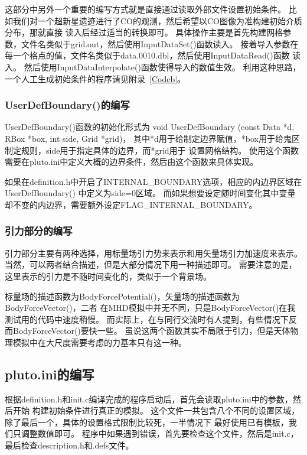 这部分中另外一个重要的编写方式就是直接通过读取外部文件设置初始条件。
比如我们对一个超新星遗迹进行了CO的观测，然后希望以CO图像为准构建初始介质分布，那就直接
读入后经过适当的转换即可。
具体操作主要是首先构建网格参数，文件名类似于grid.out，然后使用InputDataSet()函数读入。
接着导入参数在每一个格点的值，文件名类似于data.0010.dbl，然后使用InputDataRead()函数
读入。
然后使用InputDataInterpolate()函数使得导入的数值生效。
利用这种思路，一个人工生成初始条件的程序请见附录~\ref{Codeb}。

\subsubsection{UserDefBoundary()的编写}
UserDefBoundary()函数的初始化形式为
void UserDefBoundary (const Data *d, RBox *box, int side, Grid *grid)，
其中*d用于给制定边界赋值，*box用于给鬼区制定规则，side用于指定具体的边界，而*grid用于
设置网格结构。
使用这个函数需要在pluto.ini中定义大概的边界条件，然后由这个函数来具体实现。

如果在definition.h中开启了INTERNAL\_BOUNDARY选项，相应的内边界区域在UserDefBoundary()
中定义为side=0区域。
而如果想要设定随时间变化其中变量却不变的内边界，需要额外设定FLAG\_INTERNAL\_BOUNDARY。

\subsubsection{引力部分的编写}
引力部分主要有两种选择，用标量场引力势来表示和用矢量场引力加速度来表示。
当然，可以两者结合描述，但是大部分情况下用一种描述即可。
需要注意的是，这里表示的引力是不随时间变化的，类似于一个背景场。

标量场的描述函数为BodyForcePotential()，矢量场的描述函数为BodyForceVector()，二者
在MHD模拟中并无不同，只是BodyForceVector()在我测试用的代码中速度稍慢。
而实际上，在与同行交流时有人提到，有些情况下反而BodyForceVector()要快一些。
虽说这两个函数其实不局限于引力，但是天体物理模拟中在大尺度需要考虑的力基本只有这一种。

\subsection{pluto.ini的编写}
根据definition.h和init.c编译完成的程序启动后，首先会读取pluto.ini中的参数，然后开始
构建初始条件进行真正的模拟。
这个文件一共包含八个不同的设置区域，除了最后一个，具体的设置格式限制比较死，一半情况下
最好使用已有模板，我们只调整数值即可。
程序中如果遇到错误，首先要检查这个文件，然后是init.c，最后检查description.h和.defs文件。


